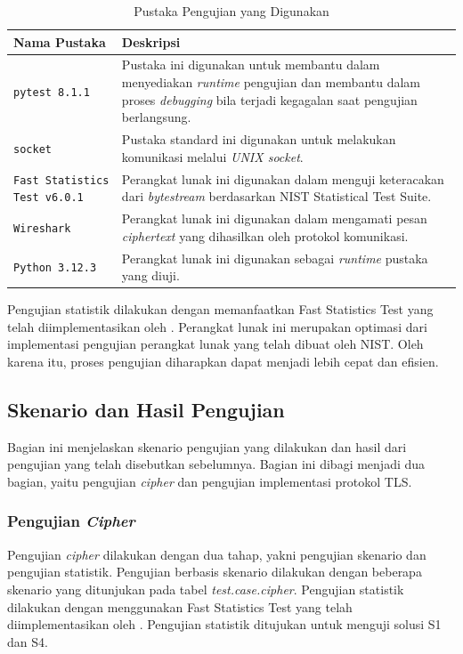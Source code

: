 \begin{table}[!h]
  \centering
  \caption{Pustaka Pengujian yang Digunakan} \label{tab:test.lib}
  \begin{tabular}{|p{4cm}|p{9cm}|}
    \hline
    \textbf{Nama Pustaka} & \textbf{Deskripsi} \\ \hline
    \texttt{pytest 8.1.1} & Pustaka ini digunakan untuk membantu dalam menyediakan \emph{runtime} pengujian dan membantu dalam proses \emph{debugging} bila terjadi kegagalan saat pengujian berlangsung. \\ \hline
    \texttt{socket} & Pustaka standard ini digunakan untuk melakukan komunikasi melalui \emph{UNIX socket}.\\ \hline
    \texttt{Fast Statistics Test v6.0.1} & Perangkat lunak ini digunakan dalam menguji keteracakan dari \emph{bytestream} berdasarkan NIST Statistical Test Suite.\\ \hline
    \texttt{Wireshark} & Perangkat lunak ini digunakan dalam mengamati pesan \emph{ciphertext} yang dihasilkan oleh protokol komunikasi.\\ \hline
    \texttt{Python 3.12.3} & Perangkat lunak ini digunakan sebagai \emph{runtime} pustaka yang diuji.\\ \hline
    \end{tabular}
  \end{table}
    

  Pengujian statistik dilakukan dengan memanfaatkan Fast Statistics Test yang telah diimplementasikan oleh \textcite{marek2016}. Perangkat lunak ini merupakan optimasi dari implementasi pengujian perangkat lunak yang telah dibuat oleh NIST. Oleh karena itu, proses pengujian diharapkan dapat menjadi lebih cepat dan efisien. 

\subsection{Skenario dan Hasil Pengujian}

Bagian ini menjelaskan skenario pengujian yang dilakukan dan hasil dari pengujian yang telah disebutkan sebelumnya. Bagian ini dibagi menjadi dua bagian, yaitu pengujian \emph{cipher} dan pengujian implementasi protokol TLS.

\subsubsection{Pengujian \emph{Cipher}}

Pengujian \emph{cipher} dilakukan dengan dua tahap, yakni pengujian skenario dan pengujian statistik. Pengujian berbasis skenario dilakukan dengan beberapa skenario yang ditunjukan pada tabel \emph{test.case.cipher}. Pengujian statistik dilakukan dengan menggunakan Fast Statistics Test yang telah diimplementasikan oleh \textcite{marek2016}. Pengujian statistik ditujukan untuk menguji solusi S1 dan S4.

